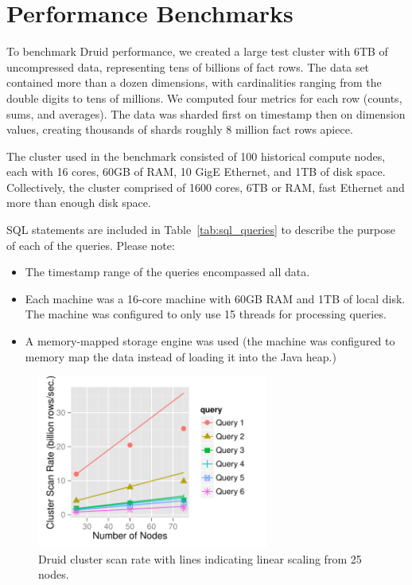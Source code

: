 \documentclass{vldb}
\begin{document}
\section{Performance Benchmarks}
\label{sec:benchmarks}
To benchmark Druid performance, we created a large test cluster with
6TB of uncompressed data, representing tens of billions of fact
rows. The data set contained more than a dozen dimensions, with
cardinalities ranging from the double digits to tens of millions. We computed
four metrics for each row (counts, sums, and averages). The data was
sharded first on timestamp then on dimension values, creating
thousands of shards roughly 8 million fact rows apiece.

The cluster used in the benchmark consisted of 100 historical compute
nodes, each with 16 cores, 60GB of RAM, 10 GigE Ethernet, and 1TB of
disk space. Collectively, the cluster comprised of 1600 cores, 6TB or
RAM, fast Ethernet and more than enough disk space.

SQL statements are included in Table~\ref{tab:sql_queries} to describe the
purpose of each of the queries. Please note:
\begin{itemize}
\item The timestamp range of the queries encompassed all data.
\item Each machine was a 16-core machine with 60GB RAM and 1TB of local
  disk. The machine was configured to only use 15 threads for
  processing queries.
\item A memory-mapped storage engine was used (the machine was configured to memory map the data
  instead of loading it into the Java heap.)
\end{itemize}

\begin{figure}
\centering
\includegraphics[width = 3in]{cluster_scan_rate}
\caption{Druid cluster scan rate with lines indicating linear scaling
  from 25 nodes.}
\label{fig:cluster_scan_rate}
\end{figure}
\end{document}

